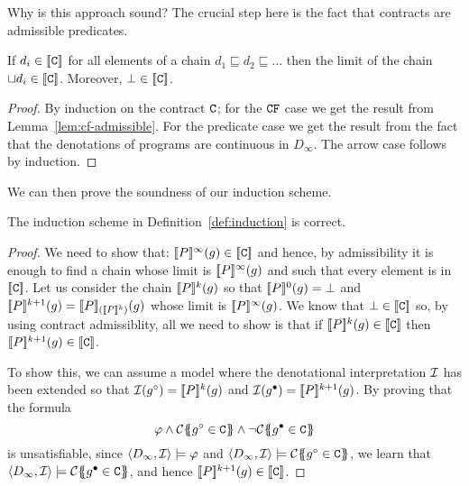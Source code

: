 Why is this approach sound? The crucial step here is the fact that contracts are admissible predicates.
\begin{theorem}
If $d_i \in \dbrace{\Ct}$ for all elements of a chain $d_1 \sqsubseteq d_2 \sqsubseteq \ldots$ then the limit of the chain 
$\sqcup d_i \in \dbrace{\Ct}$. Moreover, $\bot \in \dbrace{\Ct}$.
\end{theorem}
\begin{proof} By induction on the contract $\Ct$; for the $\CF$ case we get the result from Lemma~\ref{lem:cf-admissible}.
For the predicate case we get the result from the fact that the denotations of programs 
are continuous in $D_{\infty}$. The arrow case follows by induction.
\end{proof}

We can then prove the soundness of our induction scheme.
\begin{theorem} The induction scheme in Definition~\ref{def:induction} is correct. \end{theorem}
\begin{proof} We need to show that: 
$\dbrace{P}^{\infty}(g) \in \dbrace{\Ct}$ and hence, by admissibility it is enough to find
a chain whose limit is $\dbrace{P}^{\infty}(g)$ and such that every element is in $\dbrace{\Ct}$.
Let us consider the chain $\dbrace{P}^{k}(g)$ so that $\dbrace{P}^0(g) = \bot$ and 
$\dbrace{P}^{k+1}(g) = \dbrace{P}_{(\dbrace{P}^{k})}(g)$ whose limit is $\dbrace{P}^{\infty}(g)$. We 
know that $\bot \in \dbrace{\Ct}$ so, by using contract admissiblity, all we need to show is
that if $\dbrace{P}^{k}(g) \in \dbrace{\Ct}$ then $\dbrace{P}^{k+1}(g) \in \dbrace{\Ct}$. 

To show this, we can assume a model where the denotational interpretation ${\cal I}$ has been 
extended so that ${\cal I}(g^{\circ}) = \dbrace{P}^{k}(g)$ and ${\cal I}(g^{\bullet}) = \dbrace{P}^{k+1}(g)$.
By proving that the formula 
\[ \phi \land \ctrans{}{}{g^{\circ} \in \Ct} \land \neg \ctrans{}{}{g^{\bullet} \in \Ct} \] 
is unsatisfiable, since $\langle D_{\infty},{\cal I}\rangle \models \phi$ and 
$\langle D_{\infty},{\cal I}\rangle \models \ctrans{}{}{g^{\circ} \in \Ct}$, we learn 
that $\langle D_{\infty},{\cal I}\rangle \models \ctrans{}{}{g^{\bullet} \in \Ct}$, 
and hence $\dbrace{P}^{k+1}(g) \in \dbrace{\Ct}$.
\end{proof} 

